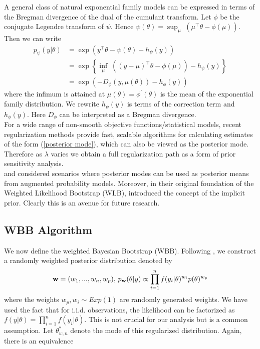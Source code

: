\documentclass[11pt]{article}%
\begin{document}
\noindent A general class of natural exponential family models can be expressed in terms of the Bregman divergence of the dual of the cumulant transform.
Let $ \phi $ be the conjugate Legendre transform of $\psi$. Hence $ \psi(\theta) = \sup_\mu \; \left ( \mu^\top \theta - \phi(\mu) \right )$. Then we can write
\begin{align*}
p_\psi ( y | \theta ) & = \exp \left ( y^\top \theta - \psi( \theta) - h_\psi(y) \right )\\
 & = \exp \left \{ \inf_\mu \; \left ( ( y - \mu )^\top \theta - \phi(\mu) \right ) - h_\psi(y) \right \}\\
& = \exp \left ( - D_\phi ( y , \mu(\theta) ) - h_\phi (y) \right )
\end{align*}
where the infimum is attained at $ \mu(\theta) = \phi^\prime (\theta) $ is the mean of the exponential family distribution. 
We rewrite $ h_\psi(y) $ is terms of the correction term and $ h_\phi(y)$. Here $D_\phi$ can be interpreted as a Bregman divergence. \\

\noindent For a wide range of non-smooth objective functions/statistical models, recent regularization methods provide fast, scalable algorithms for calculating estimates of the form (\ref{posterior mode}), which can also be viewed as the posterior mode. Therefore as $\lambda$ varies we obtain a full regularization path as a form of prior sensitivity analysis. \\

\noindent \cite{strawderman2013hierarchical} and  \cite{polson2015proximal} considered scenarios where posterior modes can be used as posterior means from augmented probability models. Moreover, in their original foundation of the Weighted Likelihood Bootstrap (WLB), \cite{newton1991approximate} introduced the concept of the implicit prior. Clearly this is an avenue for future research. 

\subsection{WBB Algorithm}
\noindent We now define the weighted Bayesian Bootstrap (WBB). Following \cite{newton1991approximate}, we construct a randomly weighted posterior distribution denoted by
$$
{\bf w} = (w_1, ..., w_n, w_p),\,
p_{\bf w}(\theta | y) \propto \prod_{i=1}^n f(y_i|\theta)^{w_i} p(\theta)^{w_p}
$$
where the weights $w_p, w_i \sim Exp(1)$ are randomly generated weights. We have used the fact that for i.i.d. observations, the likelihood can be factorized as $f(y|\theta) = \prod_{i=1}^n f(y_i|\theta)$. This is not crucial for our analysis but is a common assumption. Let $\theta^*_{w,n}$ denote the mode of this regularized distribution. Again, there is an equivalence 
\end{document}
